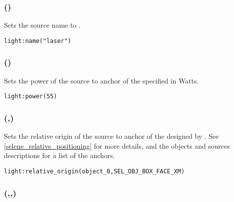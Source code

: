 \subsubsection[name]{()}

Sets the source name to .
\begin{lstlisting}
light:name("laser")
\end{lstlisting}

%

\subsubsection[power]{()}

Sets the power of the source to anchor of the specified  in Watts.
\begin{lstlisting}
light:power(55)
\end{lstlisting}

\subsubsection[relative\_origin]{(,)}

Sets the relative origin of the source to anchor of the  designed by . See \ref{selene_relative_positioning} for more details, and the objects and sources descriptions for a list of the anchors.
\begin{lstlisting}
light:relative_origin(object_0,SEL_OBJ_BOX_FACE_XM)
\end{lstlisting}

\subsubsection[rotation]{(\lft{$\alpha$},\lft{$\beta$},\lft{$\gamma$})}


